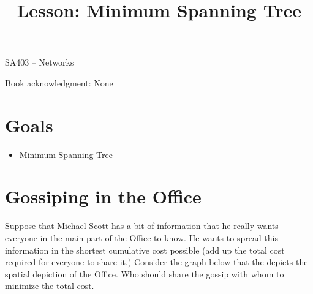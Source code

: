 \documentclass[12pt]{article}
\makeatletter
\theoremstyle{definition}
\newcommand{\graphbox}[5]%
{
\begin{tikzpicture}
     [>=latex,scale=#5]
     
     \draw [->,very thick] (#1, 0) -- (#2, 0) node[right] {$x$};
     \draw [->,very thick] (0, #3) -- (0, #4) node[above] {$y$};
     
     \draw[step=1cm,thick,dotted] (#1,#3) grid (#2,#4);
   \end{tikzpicture}
   }
\renewcommand{\maketitle}{
  \noindent SA403 -- Networks \\

  \begin{center}\Large{\textbf{\@title}}\end{center}
}
\makeatother
\begin{document}

\title{Lesson: Minimum Spanning Tree}


\maketitle



Book acknowledgment: None
\section*{Goals}
\begin{itemize}
\item Minimum Spanning Tree
\end{itemize}

\section{Gossiping in the Office}

Suppose that Michael Scott has a bit of information that he really wants everyone in the main part of the Office to know. He wants to spread this information in the shortest cumulative cost possible (add up the total cost required for everyone to share it.) Consider the graph below that the depicts the spatial depiction of the Office. Who should share the gossip with whom to minimize the total cost.
\end{document}
